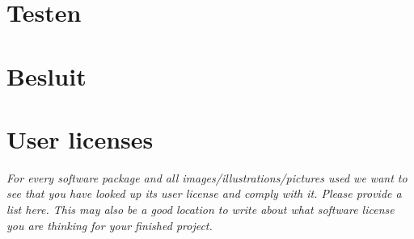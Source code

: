 \documentclass[a4paper,11pt]{article}
\newcommand{\exampletext}[1]{{\color{blue!60!black}#1}}
\begin{document}
\section{Testen}

\section{Besluit}\label{sec:besluit}


\appendix

\section{User licenses}

\exampletext{\textit{For every software package and all images/illustrations/pictures used we want to see that you have looked up its user license and comply with it. Please provide a list here. This may also be a good location to write about what software license you are thinking for your finished project.}}






\end{document}
